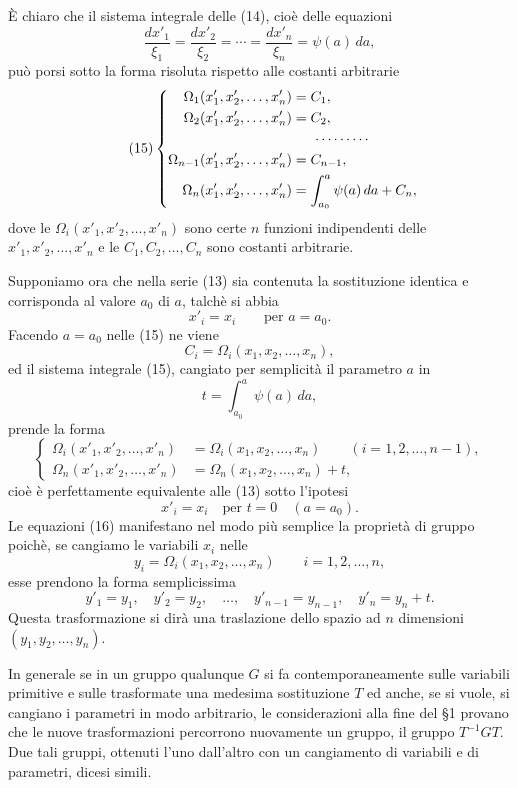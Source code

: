 \documentclass[11pt]{book}
\begin{document}
È chiaro che il sistema integrale delle (14), cioè delle equazioni
\[
 \frac{dx'_1}{\xi_1}=\frac{dx'_2}{\xi_2}=\cdots=\frac{dx'_n}{\xi_n}=\psi(a)\,da,
\]
può porsi sotto la forma risoluta rispetto alle costanti arbitrarie
\begin{equation*}\tag{15}
\left\{
\begin{aligned}
 \Omega_1(x'_1,x'_2,\ldots,x'_n)&=C_1,\\
 \Omega_2(x'_1,x'_2,\ldots,x'_n)&=C_2,\\
 &\hspace{1.5em}\cdots\cdots\cdots\\
 \Omega_{n-1}(x'_1,x'_2,\ldots,x'_n)&=C_{n-1},\\
 \Omega_n(x'_1,x'_2,\ldots,x'_n)&=\int_{a_0}^{a}\psi(a)\,da+C_n,
\end{aligned}
\right.
\end{equation*}
dove le $\Omega_i(x'_1,x'_2,\ldots,x'_n)$ sono certe $n$ funzioni indipendenti delle $x'_1,x'_2,\ldots,x'_n$ e le $C_1,C_2,\ldots,C_n$ sono costanti arbitrarie.

Supponiamo ora che nella serie (13) sia contenuta la sostituzione identica e corrisponda al valore $a_0$ di $a$, talchè si abbia
\[
 x'_i=x_i\qquad\text{per }a=a_0.
\]
Facendo $a=a_0$ nelle (15) ne viene
\[
 C_i=\Omega_i(x_1,x_2,\ldots,x_n),
\]
ed il sistema integrale (15), cangiato per semplicità il parametro $a$ in
\[
 t=\int_{a_0}^{a}\psi(a)\,da,
\]
prende la forma
\begin{equation*}\tag{16}
\left\{
\begin{aligned}
 \Omega_i(x'_1,x'_2,\ldots,x'_n)&=\Omega_i(x_1,x_2,\ldots,x_n)\qquad (i=1,2,\ldots,n-1),\\
 \Omega_n(x'_1,x'_2,\ldots,x'_n)&=\Omega_n(x_1,x_2,\ldots,x_n)+t,
\end{aligned}
\right.
\end{equation*}
cioè è perfettamente equivalente alle (13) sotto l'ipotesi
\[
 x'_i=x_i\quad\text{per }t=0\quad (a=a_0).
\]
Le equazioni (16) manifestano nel modo più semplice la proprietà di gruppo poichè, se cangiamo le variabili $x_i$ nelle
\[
 y_i=\Omega_i(x_1,x_2,\ldots,x_n)\qquad i=1,2,\ldots,n,
\]
esse prendono la forma semplicissima
\[
 y'_1=y_1,\quad y'_2=y_2,\quad\ldots,\quad y'_{n-1}=y_{n-1},\quad y'_n=y_n+t.
\]
Questa trasformazione si dirà una traslazione dello spazio ad $n$ dimensioni $(y_1,y_2,\ldots,y_n)$.

In generale se in un gruppo qualunque $G$ si fa contemporaneamente sulle variabili primitive e sulle trasformate una medesima sostituzione $T$ ed anche, se si vuole, si cangiano i parametri in modo arbitrario, le considerazioni alla fine del \S{}1 provano che le nuove trasformazioni percorrono nuovamente un gruppo, il gruppo $T^{-1}GT$. Due tali gruppi, ottenuti l'uno dall'altro con un cangiamento di variabili e di parametri, dicesi simili.
\end{document}
